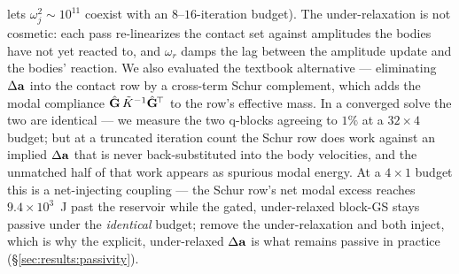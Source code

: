 lets $\omega_j^2\sim10^{11}$ coexist with an $8$--$16$-iteration budget). The
under-relaxation is not cosmetic: each pass re-linearizes the contact set against
amplitudes the bodies have not yet reacted to, and $\omega_r$ damps the lag
between the amplitude update and the bodies' reaction. We also evaluated the
textbook alternative --- eliminating
$\Delta\mathbf{a}$ into the contact row by a cross-term Schur complement, which adds the
modal compliance $\hat{\mathbf{G}}\,\tilde K^{-1}\hat{\mathbf{G}}^{\!\top}$ to the row's effective mass.
In a converged solve the two are identical --- we measure the two q-blocks
agreeing to $1\%$ at a $32{\times}4$ budget; but at a truncated iteration count
the Schur row does work against an implied $\Delta\mathbf{a}$ that is never
back-substituted into the body velocities, and the unmatched half of that work
appears as spurious modal energy. At a $4{\times}1$ budget this is a net-injecting
coupling --- the Schur row's net modal excess reaches $9.4\times10^{3}$~J past
the reservoir while the gated, under-relaxed block-GS stays passive under the
\emph{identical} budget; remove the under-relaxation and both inject, which is
why the explicit, under-relaxed $\Delta\mathbf{a}$ is what remains passive in practice
(\S\ref{sec:results:passivity}).

